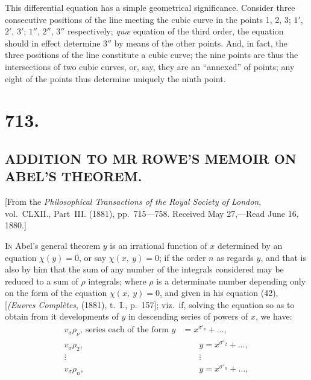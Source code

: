 \documentclass[11pt,a4paper]{book}
\begin{document}
This differential equation has a simple geometrical significance. Consider three consecutive positions of the line meeting the cubic curve in the points 1, 2, 3; $1'$, $2'$, $3'$; $1''$, $2''$, $3''$ respectively; \textit{qu\ae{}} equation of the third order, the equation should in effect determine $3''$ by means of the other points. And, in fact, the three positions of the line constitute a cubic curve; the nine points are thus the intersections of two cubic curves, or, say, they are an ``annexed'' of points; any eight of the points thus determine uniquely the ninth point.

\vspace{2em}
\noindent\dotfill

\section*{713.}
\subsection*{ADDITION TO MR ROWE'S MEMOIR ON ABEL'S THEOREM.}

\begin{center}
\small [From the \textit{Philosophical Transactions of the Royal Society of London}, vol.~CLXII., Part~III. (1881), pp.~715---758. Received May 27,---Read June 16, 1880.]
\end{center}

\medskip

\textsc{In} Abel's general theorem $y$ is an irrational function of $x$ determined by an equation $\chi(y)=0$, or say $\chi(x,\ y)=0$; if the order $n$ as regards $y$, and that is also by him that the sum of any number of the integrals considered may be reduced to a sum of $\rho$ integrals; where $\rho$ is a determinate number depending only on the form of the equation $\chi(x,\ y)=0$, and given in his equation (42), [\textit{(Euvres Compl\`etes}, (1881), t.~I., p.~157]; viz.\ if, solving the equation so as to obtain from it developments of $y$ in descending series of powers of $x$, we have:
\begin{align*}
v_\sigma\rho_\nu,\ \text{series each of the form } y&=x^{\sigma'_\nu}+\dots,\\
v_\sigma\rho_2,\ &\qquad y=x^{\sigma'_2}+\dots,\\
\vdots\qquad&\qquad\vdots\\
v_\sigma\rho_n,\ &\qquad y=x^{\sigma'_n}+\dots,
\end{align*}
\end{document}
